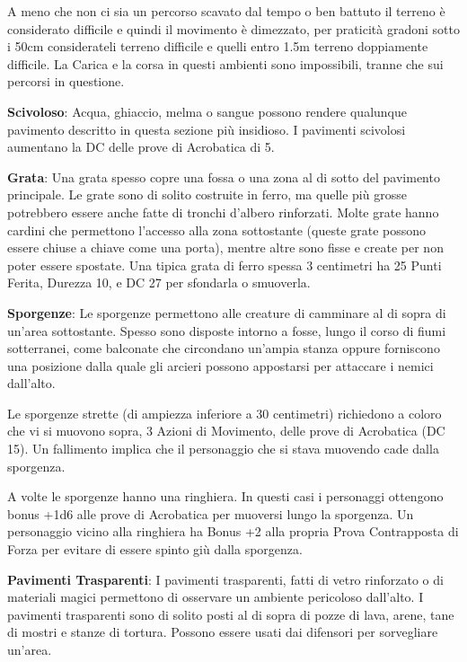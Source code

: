 \begin{multicols}{2}
A meno che non ci sia un percorso scavato dal tempo o ben battuto il terreno è considerato difficile e quindi il movimento è dimezzato, per praticità gradoni sotto i 50cm considerateli terreno difficile e quelli entro 1.5m terreno doppiamente difficile. La Carica e la corsa in questi ambienti sono impossibili, tranne che sui percorsi in questione.

\textbf{Scivoloso}: Acqua, ghiaccio, melma o sangue possono rendere qualunque pavimento descritto in questa sezione più insidioso. I pavimenti scivolosi aumentano la DC delle prove di Acrobatica di 5.

\textbf{Grata}: Una grata spesso copre una fossa o una zona al di sotto del pavimento principale. Le grate sono di solito costruite in ferro, ma quelle più grosse potrebbero essere anche fatte di tronchi d'albero rinforzati. Molte grate hanno cardini che permettono l'accesso alla zona sottostante (queste grate possono essere chiuse a chiave come una porta), mentre altre sono fisse e create per non poter essere spostate. Una tipica grata di ferro spessa 3 centimetri ha 25 Punti Ferita, Durezza 10, e DC 27 per sfondarla o smuoverla.

\textbf{Sporgenze}: Le sporgenze permettono alle creature di camminare al di sopra di un'area sottostante. Spesso sono disposte intorno a fosse, lungo il corso di fiumi sotterranei, come balconate che circondano un'ampia stanza oppure forniscono una posizione dalla quale gli arcieri possono appostarsi per attaccare i nemici dall'alto.

Le sporgenze strette (di ampiezza inferiore a 30 centimetri) richiedono a coloro che vi si muovono sopra, 3 Azioni di Movimento, delle prove di Acrobatica (DC 15). Un fallimento implica che il personaggio che si stava muovendo cade dalla sporgenza.

A volte le sporgenze hanno una ringhiera. In questi casi i personaggi ottengono bonus +1d6 alle prove di Acrobatica per muoversi lungo la sporgenza. Un personaggio vicino alla ringhiera ha Bonus +2 alla propria Prova Contrapposta di Forza per evitare di essere spinto giù dalla sporgenza.

\textbf{Pavimenti Trasparenti}: I pavimenti trasparenti, fatti di vetro rinforzato o di materiali magici permettono di osservare un ambiente pericoloso dall'alto. I pavimenti trasparenti sono di solito posti al di sopra di pozze di lava, arene, tane di mostri e stanze di tortura. Possono essere usati dai difensori per sorvegliare un'area.


\end{multicols}
